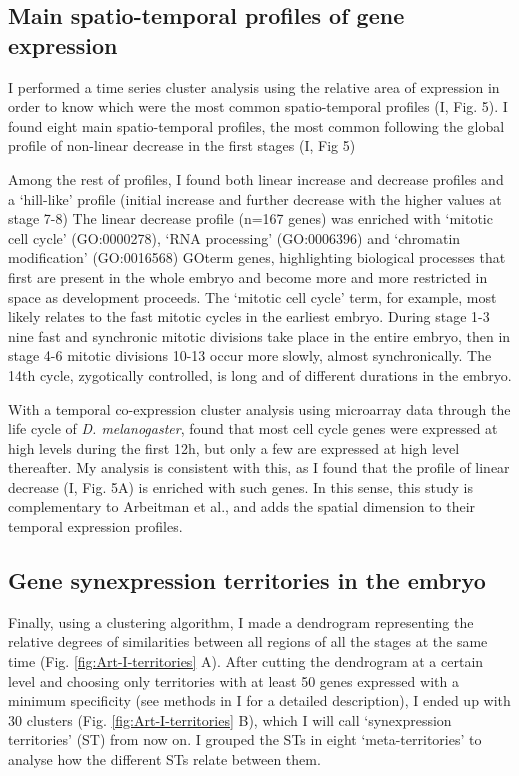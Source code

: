\subsection{Main spatio-temporal profiles of gene expression}
I performed a time series cluster analysis \citep{Ernst2006} using the relative area of expression in order to know which were the most common spatio-temporal profiles (I, Fig. 5).
I found eight main spatio-temporal profiles, the most common following the global profile of non-linear decrease in the first stages (I, Fig 5)

Among the rest of profiles, I found both linear increase and decrease profiles and a `hill-like' profile (initial increase and further decrease with the higher values at stage 7-8)
%
The linear decrease profile (n=167 genes) was enriched with `mitotic cell cycle' (GO:0000278), `RNA processing' (GO:0006396) and `chromatin modification' (GO:0016568) GOterm genes, highlighting biological processes that first are present in the whole embryo and become more and more restricted in space as development proceeds.
The `mitotic cell cycle' term, for example, most likely relates to the fast mitotic cycles in the earliest embryo. During stage 1-3 nine fast and synchronic mitotic divisions take place in the entire embryo, then in stage 4-6 mitotic divisions 10-13 occur more slowly, almost synchronically. The 14th cycle, zygotically controlled, is long and of different durations in the embryo.

With a temporal co-expression cluster analysis using microarray data through the life cycle of \textit{D. melanogaster}, \citet{Arbeitman2002} found that most cell cycle genes were expressed at high levels during the first 12h, but only a few are expressed at high level thereafter.
My analysis is consistent with this, as I found that the profile of linear decrease (I, Fig. 5A) is enriched with such genes. In this sense, this study is complementary to Arbeitman et al., and adds the spatial dimension to their temporal expression profiles.


\subsection{Gene synexpression territories in the embryo}
Finally, using a clustering algorithm, I made a dendrogram representing the relative degrees of similarities between all regions of all the stages at the same time (Fig. \ref{fig:Art-I-territories} A).
After cutting the dendrogram at a certain level and choosing only territories with at least 50 genes expressed with a minimum specificity (see methods in I for a detailed description), I ended up with 30 clusters (Fig. \ref{fig:Art-I-territories} B), which I will call `synexpression territories' (ST) from now on.
I grouped the STs in eight `meta-territories' to analyse how the different STs relate between them.

